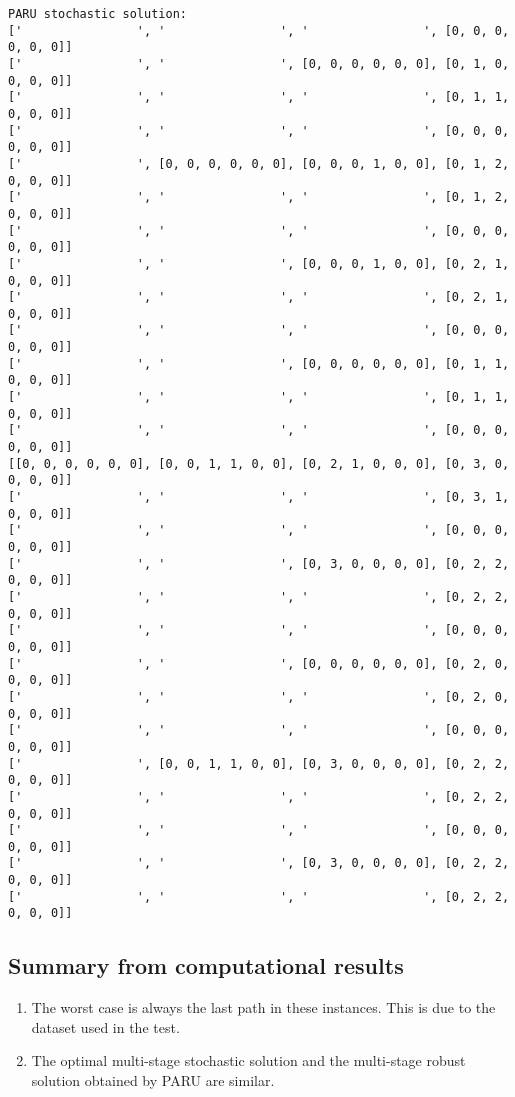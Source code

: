 \documentclass[10pt]{article}
\theoremstyle{plain}
\theoremstyle{definition}
\theoremstyle{remark}
\begin{document}
\begin{minipage}[t]{9cm}\tiny
	\begin{verbatim}
PARU stochastic solution:
['                ', '                ', '                ', [0, 0, 0, 0, 0, 0]]
['                ', '                ', [0, 0, 0, 0, 0, 0], [0, 1, 0, 0, 0, 0]]
['                ', '                ', '                ', [0, 1, 1, 0, 0, 0]]
['                ', '                ', '                ', [0, 0, 0, 0, 0, 0]]
['                ', [0, 0, 0, 0, 0, 0], [0, 0, 0, 1, 0, 0], [0, 1, 2, 0, 0, 0]]
['                ', '                ', '                ', [0, 1, 2, 0, 0, 0]]
['                ', '                ', '                ', [0, 0, 0, 0, 0, 0]]
['                ', '                ', [0, 0, 0, 1, 0, 0], [0, 2, 1, 0, 0, 0]]
['                ', '                ', '                ', [0, 2, 1, 0, 0, 0]]
['                ', '                ', '                ', [0, 0, 0, 0, 0, 0]]
['                ', '                ', [0, 0, 0, 0, 0, 0], [0, 1, 1, 0, 0, 0]]
['                ', '                ', '                ', [0, 1, 1, 0, 0, 0]]
['                ', '                ', '                ', [0, 0, 0, 0, 0, 0]]
[[0, 0, 0, 0, 0, 0], [0, 0, 1, 1, 0, 0], [0, 2, 1, 0, 0, 0], [0, 3, 0, 0, 0, 0]]
['                ', '                ', '                ', [0, 3, 1, 0, 0, 0]]
['                ', '                ', '                ', [0, 0, 0, 0, 0, 0]]
['                ', '                ', [0, 3, 0, 0, 0, 0], [0, 2, 2, 0, 0, 0]]
['                ', '                ', '                ', [0, 2, 2, 0, 0, 0]]
['                ', '                ', '                ', [0, 0, 0, 0, 0, 0]]
['                ', '                ', [0, 0, 0, 0, 0, 0], [0, 2, 0, 0, 0, 0]]
['                ', '                ', '                ', [0, 2, 0, 0, 0, 0]]
['                ', '                ', '                ', [0, 0, 0, 0, 0, 0]]
['                ', [0, 0, 1, 1, 0, 0], [0, 3, 0, 0, 0, 0], [0, 2, 2, 0, 0, 0]]
['                ', '                ', '                ', [0, 2, 2, 0, 0, 0]]
['                ', '                ', '                ', [0, 0, 0, 0, 0, 0]]
['                ', '                ', [0, 3, 0, 0, 0, 0], [0, 2, 2, 0, 0, 0]]
['                ', '                ', '                ', [0, 2, 2, 0, 0, 0]]
\end{verbatim}
\end{minipage}

\subsection*{Summary from computational results}
\begin{enumerate}
	\item The worst case is always the last path in these instances. This is due to the dataset used in the test.
	\item The optimal multi-stage stochastic solution and the multi-stage robust solution
	obtained by PARU are similar.
\end{enumerate}
\end{document}
